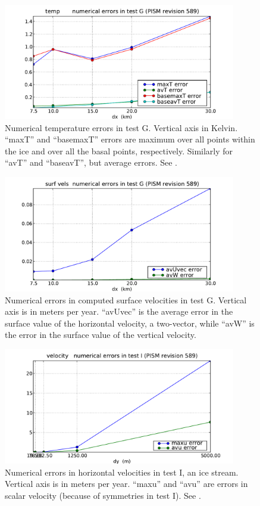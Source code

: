 \documentclass[11pt,final]{amsart}
\begin{document}
\begin{figure}[ht]
\includegraphics[width=4.0in,keepaspectratio=true]{figs/temperrs_G}
\caption{Numerical temperature errors in test G.  Vertical axis in Kelvin.  ``maxT'' and ``basemaxT'' errors are maximum over all points within the ice and over all the basal points, respectively.  Similarly for ``avT'' and ``baseavT'', but average errors.  See \cite{BBL}.}
\label{fig:temperrsG}
\end{figure}

\begin{figure}[ht]
\includegraphics[width=4.0in,keepaspectratio=true]{figs/surfvelerrs_G}
\caption{Numerical errors in computed surface velocities in test G.  Vertical axis is in meters per year.  ``avUvec'' is the average error in the surface value of the horizontal velocity, a two-vector, while ``avW'' is the error in the surface value of the vertical velocity.}
\label{fig:surfvelerrsG}
\end{figure}

\begin{figure}[ht]
\includegraphics[width=4.0in,keepaspectratio=true]{figs/velerrs_I}
\caption{Numerical errors in horizontal velocities in test I, an ice stream.  Vertical axis is in meters per year.  ``maxu'' and ``avu'' are errors in scalar velocity (because of symmetries in test I).  See \cite{SchoofStream,BBssasliding}.}
\label{fig:velerrsI}
\end{figure}
\end{document}
